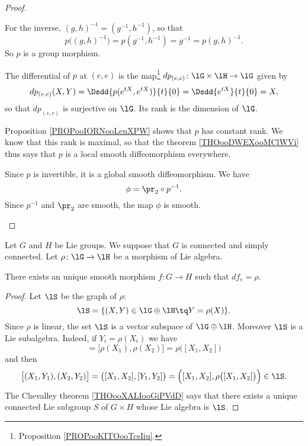 \begin{theorem}
\begin{proof}
\begin{subproof}
\begin{subproof}
\begin{equation}
			\end{equation}
			For the inverse, \( (g,h)^{-1}=(g^{-1},h^{-1})\), so that
			\begin{equation}
				p\big( (g,h)^{-1}\big)=p(g^{-1},h^{-1})=g^{-1}=p(g,h)^{-1}.
			\end{equation}
			So \( p\) is a group morphism.
		\end{subproof}
		The differential of \( p\) at \( (e,e)\) is the map\footnote{Proposition \ref{PROPooKITOooTcsIiu}.} \( dp_{(e,e)}\colon \lG\times \lH\to \lG\) given by
		\begin{equation}
			dp_{(e,e)}(X,Y)=\Dsdd{ p( e^{tX},  e^{tX}) }{t}{0}=\Dsdd{  e^{tX} }{t}{0}=X,
		\end{equation}
		so that \( dp_{(e,e)}\) is surjective on \( \lG\). Its rank is the dimension of \( \lG\).

		Proposition \ref{PROPooIORNooLeuXPW} shows that \( p\) has constant rank. We know that this rank is maximal, so that the theorem \ref{THOooDWEXooMClWVi} thus says that \( p\) is a local smooth diffeomorphism everywhere.

		Since \( p\) is invertible, it is a global smooth diffeomorphism.
		\spitem[Conclusion]
		We have
		\begin{equation}
			\phi=\pr_2\circ p^{-1}.
		\end{equation}
		Since \( p^{-1}\) and \( \pr_2\) are smooth, the map \( \phi\) is smooth.
	\end{subproof}
\end{proof}

\begin{theorem}       \label{THOooZAEYooXCdxKI}
	Let \( G\) and \( H\) be Lie groups. We suppose that \( G\) is connected and simply connected. Let \( \rho\colon \lG\to \lH\) be a morphism of Lie algebra.

	There exists an unique smooth morphism \( f\colon G\to H\) such that \( df_e=\rho\).
\end{theorem}

\begin{proof}
	Let \( \lS\) be the graph of \( \rho\):
	\begin{equation}
		\lS=\{ (X,Y)\in \lG\oplus\lH\tq Y=\rho(X) \}.
	\end{equation}
	Since \( \rho\) is linear, the set \( \lS\) is a vector subspace of \( \lG \oplus\lH\). Moreover \( \lS\) is a Lie subalgebra. Indeed, if \( Y_i=\rho(X_i)\) we have
	\begin{equation}
		[Y_1,Y_2]=\big[ \rho(X_1),\rho(X_2) \big]=\rho\big( [X_1,X_2] \big)
	\end{equation}
	and then
	\begin{equation}
		\big[ (X_1,Y_1),(X_2,Y_2) \big]=\big( [X_1,X_2],[Y_1,Y_2] \big)=\Big( [X_1,X_2],\rho\big( [X_1,X_2] \big) \Big)\in\lS.
	\end{equation}
	The Chevalley theorem \ref{THOooXALIooGiPVdD} says that there exists a unique connected Lie subgroup \( S\) of \( G\times H\) whose Lie algebra is \( \lS\).


\end{proof}
\end{theorem}
